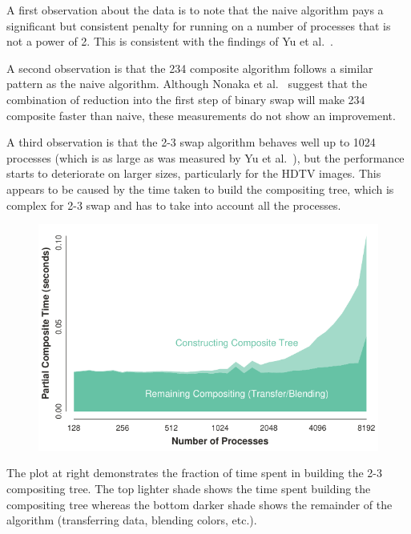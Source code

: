 \documentclass{vgtc}                          %
\newcommand*{\scite}[1]{~\cite{#1}}
\newcommand{\etal}{et al.\xspace}
\newcommand{\textalgorithm}[1]{\textsf{#1}\xspace}
\newcommand{\ttswap}{\textalgorithm{2-3 swap}}
\newcommand{\naive}{\textalgorithm{naive}}
\newcommand{\ttfcomposite}{\textalgorithm{234 composite}}
\begin{document}
A first observation about the data is to note that the \naive algorithm pays a significant but consistent penalty for running on a number of processes that is not a power of 2.
This is consistent with the findings of Yu et al.\scite{23Swap}.

A second observation is that the \ttfcomposite algorithm follows a similar pattern as the \naive algorithm.
Although Nonaka \etal\scite{Nonaka2015} suggest that the combination of reduction into the first step of binary swap will make \ttfcomposite faster than \naive, these measurements do not show an improvement.

A third observation is that the \ttswap algorithm behaves well up to 1024 processes (which is as large as was measured by Yu et al.\scite{23Swap}), but the performance starts to deteriorate on larger sizes, particularly for the HDTV images.
This appears to be caused by the time taken to build the compositing tree, which is complex for \ttswap and has to take into account all the processes.

\begin{figure}
  \includegraphics[width=\linewidth]{2-3-swap-overhead}
\end{figure}
The plot at right demonstrates the fraction of time spent in building the 2-3 compositing tree.
The top lighter shade shows the time spent building the compositing tree whereas the bottom darker shade shows the remainder of the algorithm (transferring data, blending colors, etc.).
\end{document}
